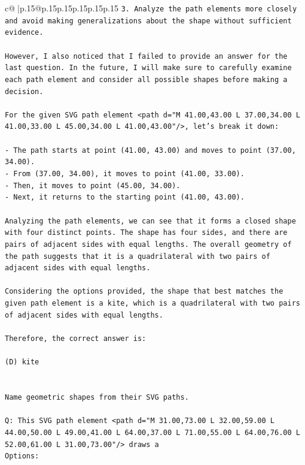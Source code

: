 \documentclass{article}
\begin{document}
{\begin{supertabular}{c@{$\;$}|p{.15\linewidth}@{}p{.15\linewidth}p{.15\linewidth}p{.15\linewidth}p{.15\linewidth}p{.15\linewidth}}
{{{\texttt{3. Analyze the path elements more closely and avoid making generalizations about the shape without sufficient evidence.} \\
\\ 
\texttt{However, I also noticed that I failed to provide an answer for the last question. In the future, I will make sure to carefully examine each path element and consider all possible shapes before making a decision. } \\
\\ 
\texttt{For the given SVG path element <path d="M 41.00,43.00 L 37.00,34.00 L 41.00,33.00 L 45.00,34.00 L 41.00,43.00"/>, let's break it down:} \\
\\ 
\texttt{{-} The path starts at point (41.00, 43.00) and moves to point (37.00, 34.00).} \\
\texttt{{-} From (37.00, 34.00), it moves to point (41.00, 33.00).} \\
\texttt{{-} Then, it moves to point (45.00, 34.00).} \\
\texttt{{-} Next, it returns to the starting point (41.00, 43.00).} \\
\\ 
\texttt{Analyzing the path elements, we can see that it forms a closed shape with four distinct points. The shape has four sides, and there are pairs of adjacent sides with equal lengths. The overall geometry of the path suggests that it is a quadrilateral with two pairs of adjacent sides with equal lengths.} \\
\\ 
\texttt{Considering the options provided, the shape that best matches the given path element is a kite, which is a quadrilateral with two pairs of adjacent sides with equal lengths.} \\
\\ 
\texttt{Therefore, the correct answer is:} \\
\\ 
\texttt{(D) kite} \\
\\ 
\\ 
\texttt{Name geometric shapes from their SVG paths.} \\
\\ 
\texttt{Q: This SVG path element <path d="M 31.00,73.00 L 32.00,59.00 L 44.00,50.00 L 49.00,41.00 L 64.00,37.00 L 71.00,55.00 L 64.00,76.00 L 52.00,61.00 L 31.00,73.00"/> draws a} \\
\texttt{Options:} \\
}}}
\end{supertabular}}
\end{document}
